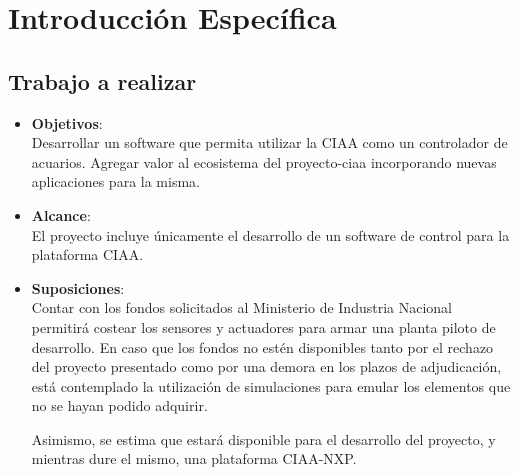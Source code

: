 \chapter{Introducción Específica} %

\label{Chapter2}


\section{Trabajo a realizar}


\begin{itemize}

	\item \textbf{Objetivos}:\\
	Desarrollar un software que permita utilizar la CIAA como un controlador de acuarios. Agregar valor al ecosistema del proyecto-ciaa incorporando nuevas aplicaciones para la misma.
	
	\item \textbf{Alcance}:\\
	El proyecto incluye únicamente el desarrollo de un software de control para la plataforma CIAA.


	\item \textbf{Suposiciones}:\\
	Contar con los fondos solicitados al Ministerio de Industria Nacional permitirá costear los sensores y actuadores para armar una planta piloto de desarrollo.  En caso que los fondos no estén disponibles tanto por el rechazo del proyecto presentado como por una demora en los plazos de adjudicación, está contemplado la utilización de simulaciones para emular los elementos que no se hayan podido adquirir.
	
	Asimismo, se estima que estará disponible para el desarrollo del proyecto, y mientras dure el mismo, una plataforma CIAA-NXP.
	
	\end{itemize}

